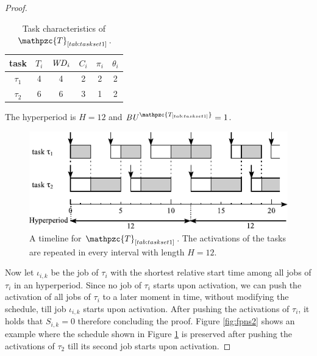 \documentclass[conference,compsoc]{IEEEtran}
\newcommand{\wcd}   {\mbox{\it WD}}
\newcommand{\bu}    {\mbox{\it BU}}
\begin{document}
\begin{proof}

	\begin{table}[h]
		\center
		\caption{Task characteristics of $\mathpzc{T}_{\ref{tab:taskset1}}$.}
		\label{tab:taskset1}
		\begin{tabular}{c | c c c c c}
			\hline 
			task & $T_i$ & $\wcd_i$ & $C_i$ & $\pi_i$ & $\theta_i$  \\ 
			\hline 
			$\tau_1$& 4 & 4 & 2  & 2 & 2\\ 
			$\tau_2$& 6 & 6 & 3  & 1 & 2\\ 
			\hline 
		\end{tabular}
		\small
		\item The hyperperiod is $H=12$ and $\bu^{\mathpzc{T_{\ref{tab:taskset1}}}}=1$.
	\end{table}
	
	\begin{figure}[h]
		\centering
		\includegraphics[width=1\linewidth]{fig/fpns1}
		\caption{A timeline for $\mathpzc{T}_{\ref{tab:taskset1}}$. The activations of the tasks are repeated in every interval with length $H=12$.}
		\label{fig:fpns1}
	\end{figure}
	
	Now let $\iota_{i,k}$ be the job of $\tau_i$ with the shortest relative start time among all jobs of $\tau_i$ in an hyperperiod. Since no job of $\tau_i$ starts upon activation, we can push the activation of all jobs of $\tau_i$ to a later moment in time, without modifying the schedule, till job $\iota_{i,k}$ starts upon activation. After pushing the activations of $\tau_i$, it holds that $S_{i,k}=0$ therefore concluding the proof. Figure \ref{fig:fpns2} shows an example where the schedule shown in Figure \ref{fig:fpns1} is preserved after pushing the activations of $\tau_2$ till its second job starts upon activation.	
%	
\end{proof}
\end{document}
